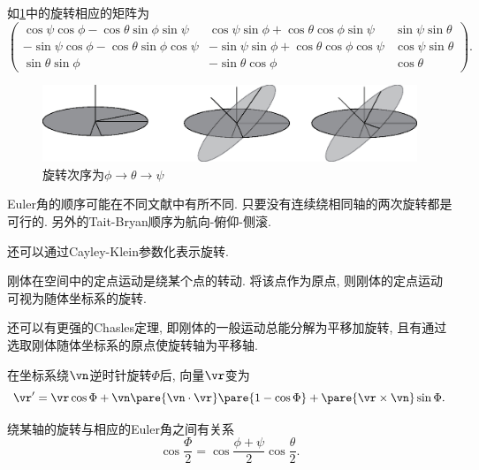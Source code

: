 \documentclass[../TheoreticalMechanics.tex]{subfiles}
\begin{document}
\begin{theorem}[Euler角相应的矩阵]
    \label{thm:Euler角相应的矩阵}
    如\cref{fig:Euler角的旋转次序}中的旋转相应的矩阵为
    \[ \begin{pmatrix}
        \cos\psi\cos\phi - \cos\theta\sin\phi\sin\psi & \cos\psi\sin\phi+\cos\theta\cos\phi\sin\psi & \sin\psi\sin\theta \\
        -\sin\psi\cos\phi-\cos\theta\sin\phi\cos\psi & -\sin\psi\sin\phi + \cos\theta\cos\phi\cos\psi & \cos\psi\sin\theta \\
        \sin\theta\sin\phi & -\sin\theta\cos\phi & \cos\theta
    \end{pmatrix}. \]
\end{theorem}
\begin{figure}[ht]
    \centering
    \includegraphics[width=.7\textwidth]{src/EulerAngles.eps}
    \caption{旋转次序为$\phi\rightarrow \theta\rightarrow\psi$}
    \label{fig:Euler角的旋转次序}
\end{figure}
\begin{remark}
    Euler角的顺序可能在不同文献中有所不同. 只要没有连续绕相同轴的两次旋转都是可行的. 另外的Tait-Bryan顺序为航向-俯仰-侧滚.
\end{remark}
\begin{ex}
    还可以通过Cayley-Klein参数化表示旋转.
\end{ex}
\begin{finale}
    \begin{theorem}[Euler定理]
        刚体在空间中的定点运动是绕某个点的转动. 将该点作为原点, 则刚体的定点运动可视为随体坐标系的旋转.
    \end{theorem}
\end{finale}
\begin{remark}
    还可以有更强的Chasles定理, 即刚体的一般运动总能分解为平移加旋转, 且有通过选取刚体随体坐标系的原点使旋转轴为平移轴.
\end{remark}
\begin{lemma}[旋转的向量表示]
    在坐标系绕$\vn$逆时针旋转$\Phi$后, 向量$\vr$变为
    \[ \vr' = \vr\cos\Phi + \vn\pare{\vn\cdot\vr}\pare{1-\cos\Phi} + \pare{\vr\times\vn}\sin\Phi. \]
\end{lemma}
\begin{lemma}[旋转角与Euler角的关系]
    绕某轴的旋转与相应的Euler角之间有关系
    \[ \cos\frac{\Phi}{2} = \cos\frac{\phi + \psi}{2}\cos\frac{\theta}{2}. \]
\end{lemma}
\end{document}
